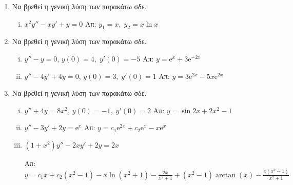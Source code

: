


\pagestyle{askhseis}
\everymath{\displaystyle}





\begin{center}
\end{center}

\vspace{\baselineskip}

\begin{enumerate}
  \item Να βρεθεί η γενική λύση των παρακάτω σδε.
    \begin{enumerate}[i)]
      \item $ x^{2}y'' - xy' + y = 0 $ \hfill Απ: $ y_{1}=x, \; y_{2} = x \ln{x} $ 
    \end{enumerate}

  \item Να βρεθεί η γενική λύση των παρακάτω σδε.
    \begin{enumerate}[i)]
      \item $ y'' - y=0 $, \quad $ y(0)=4, \; y'(0)=-5 $ 
        \hfill Απ:  $ y= \mathrm{e}^{x}+3 \mathrm{e}^{-2x} $ 
      \item $ y''-4y'+4y=0 $, \quad $ y(0)=3, \; y'(0)=1 $ 
        \hfill Απ:  $ y=3 \mathrm{e}^{2x} - 5x \mathrm{e}^{2x} $
    \end{enumerate}

  \item Να βρεθεί η γενική λύση των παρακάτω σδε.
    \begin{enumerate}[i)]
      \item $ y''+4y=8x^{2} $, \quad $ y(0)=-1, \; y'(0)=2 $ 
        \hfill Απ: $ y= \sin{2x} + 2x^{2}-1 $ 
      \item $ y''-3y'+2y= \mathrm{e}^{x} $
        \hfill Απ: $ y= c_{1} \mathrm{e}^{2x} + c_{2} \mathrm{e}^{x} - x
        \mathrm{e}^{x}  $ 
      \item $ (1+x^{2})y''-2xy'+2y=2x $ 

        \hfill Απ: $ y= c_{1}x + c_{2}(x^{2}-1) - x \ln{(x^{2}+1)} - \frac{2x}{x^{2}+1}
        + (x^{2}-1) \arctan(x) - \frac{x(x^{2}-1)}{x^{2}+1} $
    \end{enumerate}
\end{enumerate}






